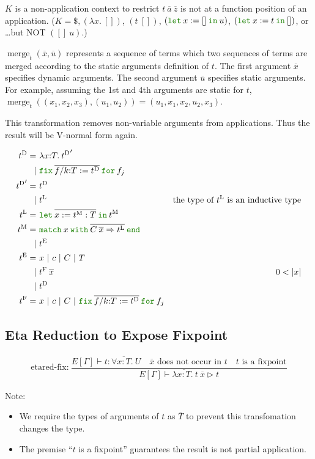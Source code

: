 \documentclass[a4paper,fleqn]{article}
\newcommand{\kwlet}{\mbox{\color{mygreen}\ttfamily let}}
\newcommand{\kwin}{\mbox{\color{mygreen}\ttfamily in}}
\newcommand{\kwmatch}{\mbox{\color{mygreen}\ttfamily match}}
\newcommand{\kwwith}{\mbox{\color{mygreen}\ttfamily with}}
\newcommand{\kwend}{\mbox{\color{mygreen}\ttfamily end}}
\newcommand{\kwfix}{\mbox{\color{mygreen}\ttfamily fix}}
\newcommand{\kwfor}{\mbox{\color{mygreen}\ttfamily for}}
\newcommand{\lam}[2]{\lambda #1.\:#2}
\newcommand{\lamT}[3]{\lambda #1\mathord{:}#2.\:#3}
\newcommand{\letin}[3]{\kwlet\:#1:=#2\:\kwin\:#3}
\newcommand{\letinM}[3]{\kwlet\:\rep{#1:=#2}\:\kwin\:#3}
\newcommand{\omatch}[2]{\kwmatch\:#1\:\kwwith\:{#2}\:\kwend}
\newcommand{\ofix}[2]{\kwfix\:{#1}\:\kwfor\:{#2}}
\newcommand{\tD}{{t^\mathrm{D}}}
\newcommand{\tE}{{t^\mathrm{E}}}
\newcommand{\tL}{{t^\mathrm{L}}}
\newcommand{\tM}{{t^\mathrm{M}}}
\newcommand{\tF}{{t^\mathrm{F}}}
\DeclareMathOperator{\merg}{merge}
\newcommand{\reltri}{\mathrel{\triangleright}}
\newcommand{\rep}[1]{\overline{#1}}
\begin{document}
$K$ is a non-application context to restrict $t\:\rep{a}\:\rep{z}$ is not at a function position of an application.
($K = \$, (\lam{x}{[]})$, $(t\:[])$, $(\letin{x}{[]}{u})$, $(\letin{x}{t}{[]})$, or \ldots but NOT $([]\:u)$.)

$\merg_t(\rep{x}, \rep{u})$ represents a sequence of terms which two sequences of terms are merged according to the static arguments definition of $t$.
The first argument $\rep{x}$ specifies dynamic arguments.
The second argument $\rep{u}$ specifies static arguments.
For example, assuming the 1st and 4th arguments are static for $t$, $\merg_t((x_1, x_2, x_3), (u_1, u_2)) = (u_1, x_1, x_2, u_2, x_3)$.

This transformation removes non-variable arguments from applications.
Thus the result will be V-normal form again.

\begin{align*}
  \tD =&\ \lamT{x}{T}{\tD'} \\
      |&\ \ofix{\overline{f/k{:}T:=\tD}}{f_j} \\
  \tD' =&\ \tD \\
       |&\ \tL & \text{the type of $\tL$ is an inductive type} \\
  \tL =&\ \letinM{x}{\tM:T}{\tM} \\
  \tM =&\ \omatch{x}{\overline{C\:\overline{x}\Rightarrow \tL}} \\
      |&\ \tE \\
  \tE =&\ x ~|~ c ~|~ C ~|~ T \\
    |&\ \tF\:\rep{x} & \text{$0 < |x|$} \\
    |&\ \tD \\
  \tF =&\ x ~|~ c ~|~ C ~|~ \ofix{\overline{f/k{:}T:=\tD}}{f_j}
\end{align*}

\subsection{Eta Reduction to Expose Fixpoint}\label{sec:eta-reduction}

\begin{gather*}
  \text{etared-fix:}~
    \dfrac{
      E[\Gamma] \vdash t : \forall \overline{x{:}T}.\: U \quad
      \text{$\overline{x}$ does not occur in $t$} \quad
      \text{$t$ is a fixpoint}
    }{E[\Gamma] \vdash \lam{\overline{x{:}T}}{t\: \overline{x}}
                       \reltri
                       t
    }
\end{gather*}
{\small Note:
\begin{itemize}
  \item We require the types of arguments of $t$ as $\overline{T}$ to prevent this transfomation changes the type.
  \item The premise ``$t$ is a fixpoint'' guarantees the result is not partial application.
\end{itemize}}
\end{document}
